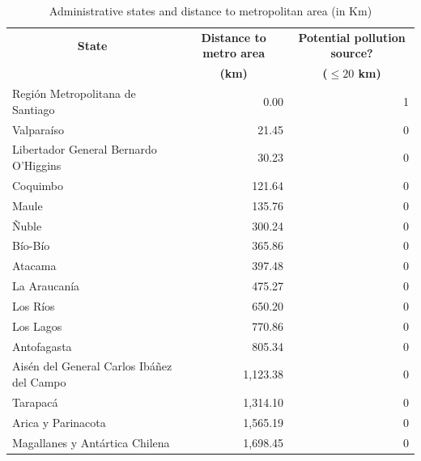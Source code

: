 \begin{table}[htbp]
  \centering
  \caption{Administrative states and distance to metropolitan area (in Km)}
  \begin{tabular}{lrr}
    \midrule
    \midrule
    \multicolumn{1}{c}{\textbf{State}} &
    \multicolumn{1}{c}{\textbf{Distance to metro area}} &
    \multicolumn{1}{c}{\textbf{Potential pollution source?}} \\
    \multicolumn{1}{c}{} &
    \multicolumn{1}{c}{\textbf{(km)}} &
    \multicolumn{1}{c}{\textbf{($\leq 20$ km)}} \\
    \midrule
    Región Metropolitana de Santiago & 0.00 & 1 \\
    Valparaíso & 21.45 & 0 \\
    Libertador General Bernardo O'Higgins & 30.23 & 0 \\
    Coquimbo & 121.64 & 0 \\
    Maule & 135.76 & 0 \\
    Ñuble & 300.24 & 0 \\
    Bío-Bío & 365.86 & 0 \\
    Atacama & 397.48 & 0 \\
    La Araucanía & 475.27 & 0 \\
    Los Ríos & 650.20 & 0 \\
    Los Lagos & 770.86 & 0 \\
    Antofagasta & 805.34 & 0 \\
    Aisén del General Carlos Ibáñez del Campo & 1,123.38 & 0 \\
    Tarapacá & 1,314.10 & 0 \\
    Arica y Parinacota & 1,565.19 & 0 \\
    Magallanes y Antártica Chilena & 1,698.45 & 0 \\
    \bottomrule
    \bottomrule
  \end{tabular}
  \label{table_state_metro_distances}
\end{table}
